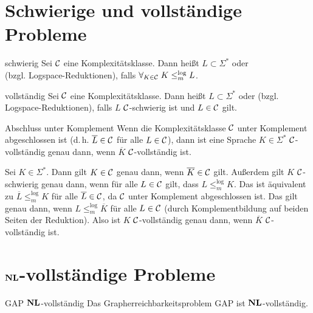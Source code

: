 \pagebreak

\section{%
    Schwierige und vollständige Probleme%
}

\begin{Def}{schwierig}
    Sei $\mathcal{C}$ eine Komplexitätsklasse.
    Dann heißt $L \subset \Sigma^\ast$  oder\\
     (bzgl. Logspace-Reduktionen),
    falls $\forall_{K \in \mathcal{C}}\; K \le_m^{\log} L$.
\end{Def}

\begin{Def}{vollständig}
    Sei $\mathcal{C}$ eine Komplexitätsklasse.
    Dann heißt $L \subset \Sigma^\ast$  oder
     (bzgl. Logspace-Reduktionen),
    falls $L$ $\mathcal{C}$-schwierig ist und $L \in \mathcal{C}$ gilt.
\end{Def}

\linie

\begin{Satz}{Abschluss unter Komplement}
    Wenn die Komplexitätsklasse $\mathcal{C}$ unter Komplement abgeschlossen ist
    (d.\,h. $\overline{L} \in \mathcal{C}$ für alle $L \in \mathcal{C}$),
    dann ist eine Sprache $K \in \Sigma^\ast$ $\mathcal{C}$-vollständig genau dann,
    wenn $\overline{K}$ $\mathcal{C}$-vollständig ist.
\end{Satz}

\begin{Beweis}
    Sei $K \in \Sigma^\ast$.
    Dann gilt $K \in \mathcal{C}$ genau dann, wenn $\overline{K} \in \mathcal{C}$ gilt.
    Außerdem gilt $K$ $\mathcal{C}$-schwierig genau dann, wenn für alle
    $L \in \mathcal{C}$ gilt, dass $L \le_m^{\log} K$.
    Das ist äquivalent zu $\overline{L} \le_m^{\log} K$ für alle $\overline{L} \in \mathcal{C}$,
    da $\mathcal{C}$ unter Komplement abgeschlossen ist.
    Das gilt genau dann, wenn $L \le_m^{\log} \overline{K}$ für alle $L \in \mathcal{C}$
    (durch Komplementbildung auf beiden Seiten der Reduktion).
    Also ist $K$ $\mathcal{C}$-vollständig genau dann, wenn $\overline{K}$
    $\mathcal{C}$-vollständig ist.
\end{Beweis}

\section{%
    \texorpdfstring{$\mathbf{NL}$}{NL}-vollständige Probleme%
}

\begin{Satz}{GAP $\mathbf{NL}$-vollständig}
    Das Grapherreichbarkeitsproblem GAP ist $\mathbf{NL}$-vollständig.
\end{Satz}

